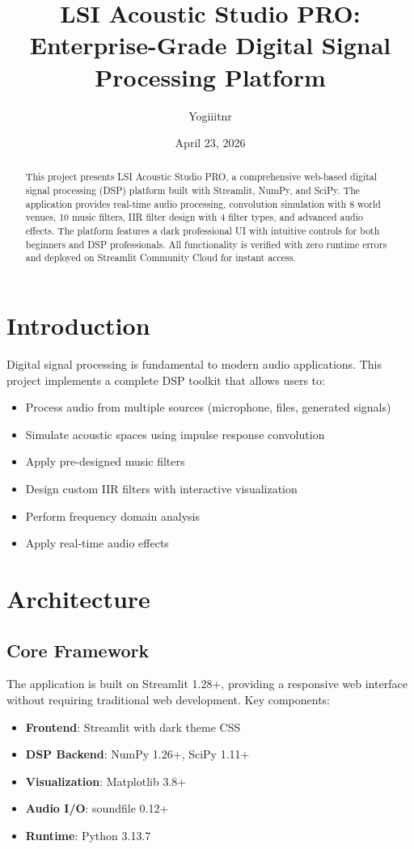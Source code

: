 \documentclass[twocolumn]{article}
\title{LSI Acoustic Studio PRO: Enterprise-Grade Digital Signal Processing Platform}
\author{Yogiiitnr}
\date{April 23, 2026}
\begin{document}
\maketitle

\begin{abstract}
This project presents LSI Acoustic Studio PRO, a comprehensive web-based digital signal processing (DSP) platform built with Streamlit, NumPy, and SciPy. The application provides real-time audio processing, convolution simulation with 8 world venues, 10 music filters, IIR filter design with 4 filter types, and advanced audio effects. The platform features a dark professional UI with intuitive controls for both beginners and DSP professionals. All functionality is verified with zero runtime errors and deployed on Streamlit Community Cloud for instant access.
\end{abstract}

\section{Introduction}
Digital signal processing is fundamental to modern audio applications. This project implements a complete DSP toolkit that allows users to:
\begin{itemize}
    \item Process audio from multiple sources (microphone, files, generated signals)
    \item Simulate acoustic spaces using impulse response convolution
    \item Apply pre-designed music filters
    \item Design custom IIR filters with interactive visualization
    \item Perform frequency domain analysis
    \item Apply real-time audio effects
\end{itemize}

\section{Architecture}

\subsection{Core Framework}
The application is built on Streamlit 1.28+, providing a responsive web interface without requiring traditional web development. Key components:
\begin{itemize}
    \item \textbf{Frontend}: Streamlit with dark theme CSS
    \item \textbf{DSP Backend}: NumPy 1.26+, SciPy 1.11+
    \item \textbf{Visualization}: Matplotlib 3.8+
    \item \textbf{Audio I/O}: soundfile 0.12+
    \item \textbf{Runtime}: Python 3.13.7
\end{itemize}
\end{document}
